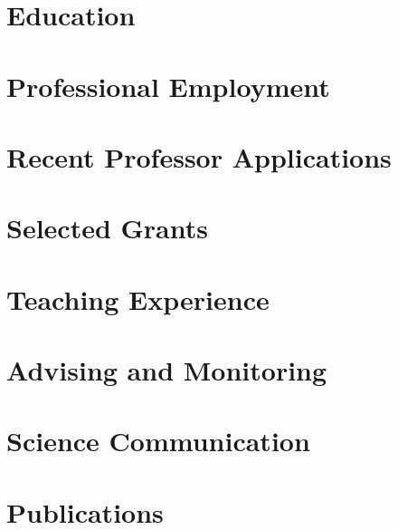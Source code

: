 \documentclass[a4paper,12pt]{article}
\begin{document}



\section{Education}



\section{Professional Employment}



\section{Recent Professor Applications}

%
\section{Selected Grants}


\section{Teaching Experience}
%







\section{Advising and Monitoring}



\section{Science Communication}



\section{Publications}

\end{document}
